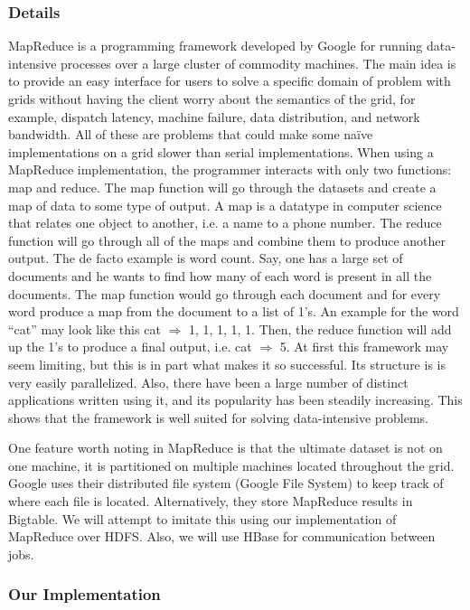\documentclass{rspublic}
\begin{document}
\subsubsection{Details}

MapReduce is a programming framework developed by Google for running
data-intensive processes over a large cluster of commodity machines.
The main idea is to provide an easy interface for users to solve a
specific domain of problem with grids without having the client worry 
about the semantics of the grid, for example, dispatch latency, machine
failure, data distribution, and network bandwidth.  All of these are
problems that could make some naïve implementations on a grid slower
than serial implementations.  When using a MapReduce implementation,
the programmer interacts with only two functions: map and reduce.  
The map function will go through the datasets and create a map of data
to some type of output.  A map is a datatype in computer science that
relates one object to another, i.e. a name to a phone number.  The reduce
function will go through all of the maps and combine them to produce
another output.  The de facto example is word count.  Say, one has a
large set of documents and he wants to find how many of each word is
present in all the documents.  The map function would go through each
document and for every word produce a map from the document to a list
of 1’s.  An example for the word “cat” may look like this cat $\Rightarrow$ 1, 1,
1, 1, 1.  Then, the reduce function will add up the 1’s to produce a
final output, i.e. cat $\Rightarrow$ 5.  At first this framework may seem limiting,
but this is in part what makes it so successful.  Its structure is 
is very easily parallelized.   Also, there have been a large number
of distinct applications written using it, and its popularity has been
steadily increasing.  This shows that the framework is well suited for
solving data-intensive problems.

One feature worth noting in MapReduce is that the ultimate dataset is not 
on one machine, it is partitioned on multiple machines located throughout the 
grid. Google uses their distributed file system (Google File System) to keep 
track of where each file is located.  Alternatively, they store MapReduce 
results in Bigtable.  We will attempt to imitate this using our implementation
of MapReduce over HDFS.  Also, we will use HBase for communication between jobs.

\subsubsection{Our Implementation} 
\end{document}

